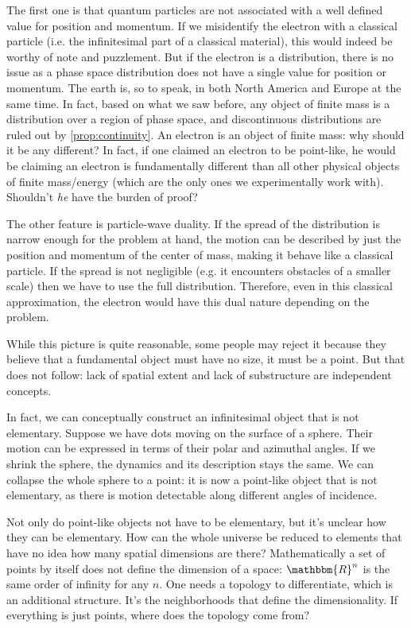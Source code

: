 \documentclass[aps,pra,10pt,twocolumn,floatfix,nofootinbib]{revtex4-1}
\numberwithin{equation}{section}
\theoremstyle{definition}
\begin{document}
The first one is that quantum particles are not associated with a well defined value for position and momentum. If we misidentify the electron with a classical particle (i.e. the infinitesimal part of a classical material), this would indeed be worthy of note and puzzlement. But if the electron is a distribution, there is no issue as a phase space distribution does not have a single value for position or momentum. The earth is, so to speak, in both North America and Europe at the same time. In fact, based on what we saw before, any object of finite mass is a distribution over a region of phase space, and discontinuous distributions are ruled out by \ref{prop:continuity}. An electron is an object of finite mass: why should it be any different? In fact, if one claimed an electron to be point-like, he would be claiming an electron is fundamentally different than all other physical objects of finite mass/energy (which are the only ones we experimentally work with). Shouldn't \emph{he} have the burden of proof?

The other feature is particle-wave duality. If the spread of the distribution is narrow enough for the problem at hand, the motion can be described by just the position and momentum of the center of mass, making it behave like a classical particle. If the spread is not negligible (e.g. it encounters obstacles of a smaller scale) then we have to use the full distribution. Therefore, even in this classical approximation, the electron would have this dual nature depending on the problem.

While this picture is quite reasonable, some people may reject it because they believe that a fundamental object must have no size, it must be a point. But that does not follow: lack of spatial extent and lack of substructure are independent concepts.

In fact, we can conceptually construct an infinitesimal object that is not elementary. Suppose we have dots moving on the surface of a sphere. Their motion can be expressed in terms of their polar and azimuthal angles. If we shrink the sphere, the dynamics and its description stays the same. We can collapse the whole sphere to a point: it is now a point-like object that is not elementary, as there is motion detectable along different angles of incidence.

Not only do point-like objects not have to be elementary, but it's unclear how they can be elementary. How can the whole universe be reduced to  elements that have no idea how many spatial dimensions are there? Mathematically a set of points by itself does not define the dimension of a space: $\mathbbm{R}^n$ is the same order of infinity for any $n$. One needs a topology to differentiate, which is an additional structure. It's the neighborhoods that define the dimensionality. If everything is just points, where does the topology come from? 
\end{document}
